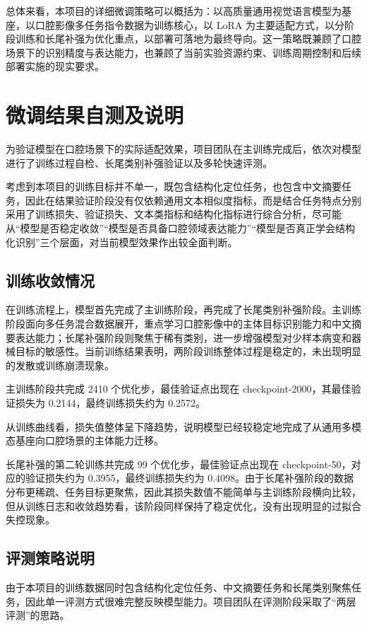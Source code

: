 总体来看，本项目的详细微调策略可以概括为：以高质量通用视觉语言模型为基座，以口腔影像多任务指令数据为训练核心，以 LoRA 为主要适配方式，以分阶段训练和长尾补强为优化重点，以部署可落地为最终导向。这一策略既兼顾了口腔场景下的识别精度与表达能力，也兼顾了当前实验资源约束、训练周期控制和后续部署实施的现实要求。

\section{微调结果自测及说明}

为验证模型在口腔场景下的实际适配效果，项目团队在主训练完成后，依次对模型进行了训练过程自检、长尾类别补强验证以及多轮快速评测。

考虑到本项目的训练目标并不单一，既包含结构化定位任务，也包含中文摘要任务，因此在结果验证阶段没有仅依赖通用文本相似度指标，而是结合任务特点分别采用了训练损失、验证损失、文本类指标和结构化指标进行综合分析，尽可能从“模型是否稳定收敛”“模型是否具备口腔领域表达能力”“模型是否真正学会结构化识别”三个层面，对当前模型效果作出较全面判断。

\subsection{训练收敛情况}

在训练流程上，模型首先完成了主训练阶段，再完成了长尾类别补强阶段。主训练阶段面向多任务混合数据展开，重点学习口腔影像中的主体目标识别能力和中文摘要表达能力；长尾补强阶段则聚焦于稀有类别，进一步增强模型对少样本病变和器械目标的敏感性。当前训练结果表明，两阶段训练整体过程是稳定的，未出现明显的发散或训练崩溃现象。

主训练阶段共完成 2410 个优化步，最佳验证点出现在 checkpoint-2000，其最佳验证损失为 0.2144，最终训练损失约为 0.2572。

从训练曲线看，损失值整体呈下降趋势，说明模型已经较稳定地完成了从通用多模态基座向口腔场景的主体能力迁移。

长尾补强的第二轮训练共完成 99 个优化步，最佳验证点出现在 checkpoint-50，对应的验证损失约为 0.3955，最终训练损失约为 0.4098。由于长尾补强阶段的数据分布更稀疏、任务目标更聚焦，因此其损失数值不能简单与主训练阶段横向比较，但从训练日志和收敛趋势看，该阶段同样保持了稳定优化，没有出现明显的过拟合失控现象。

\subsection{评测策略说明}

由于本项目的训练数据同时包含结构化定位任务、中文摘要任务和长尾类别聚焦任务，因此单一评测方式很难完整反映模型能力。项目团队在评测阶段采取了“两层评测”的思路。

